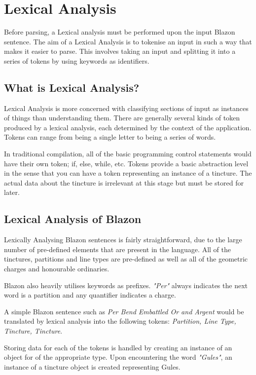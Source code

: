 \chapter{Lexical Analysis} 


Before parsing, a Lexical analysis must be performed upon the input Blazon sentence. The aim of a Lexical Analysis is to tokenise an input in such a way that makes it easier to parse.  This involves taking an input and splitting it into a series of tokens by using keywords as identifiers.


\section{What is Lexical Analysis?}
Lexical Analysis is more concerned with classifying sections of input as instances of things than understanding them.  There are generally several kinds of token produced by a lexical analysis, each determined by the context of the application.  Tokens can range from being a single letter to being a series of words.

In traditional compilation, all of the basic programming control statements would have their own token; if, else, while, etc.  Tokens provide a basic abstraction level in the sense that you can have a token representing an instance of a tincture. The actual data about the tincture is irrelevant at this stage but must be stored for later. 

\section{Lexical Analysis of Blazon} 

Lexically Analysing Blazon sentences is fairly straightforward, due to the large number of pre-defined elements that are present in the language.  All of the tinctures, partitions and line types are pre-defined as well as all of the geometric charges and honourable ordinaries.  

Blazon also heavily utilises keywords as prefixes. \emph{"Per"} always indicates the next word is a partition and any quantifier indicates a charge.  


A simple Blazon sentence such as \emph{Per Bend Embattled Or and Argent} would be translated by lexical analysis into the following tokens: \emph{Partition, Line Type,  Tincture, Tincture}. 

Storing data for each of the tokens is handled by creating an instance of an object for of the appropriate type. Upon encountering the word \emph{"Gules"}, an instance of a tincture object is created representing Gules. 

